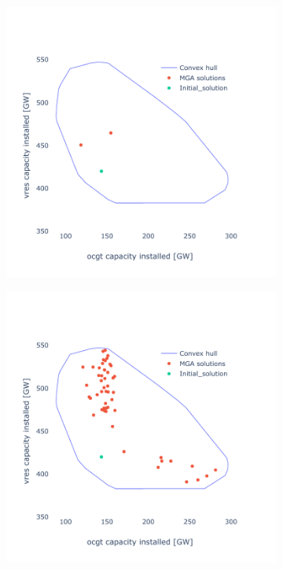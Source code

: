 \begin{figure}[h]
\begin{subfigure}{.5\textwidth}
		\caption{}
		\label{fig:comparison_2}
	\end{subfigure}%
	\vspace{1pt}
	\begin{subfigure}{.5\textwidth}
		\includegraphics[width=1.\textwidth]{./Images/Comparison_2}
		\caption{}
		\label{fig:comparison_3}
	\end{subfigure}%
	\begin{subfigure}{.5\textwidth}
		\includegraphics[width=1.\textwidth]{./Images/comparison_3}

\end{subfigure}
\end{figure}
